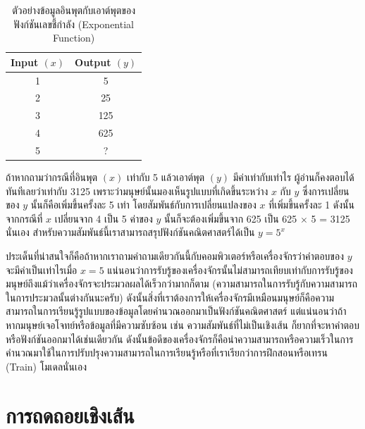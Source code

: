 \begin{table}[H]
    \centering
    \caption{ตัวอย่างข้อมูลอินพุตกับเอาต์พุตของฟังก์ชันเลขชี้กำลัง (Exponential Function)}
    \label{tab:simple_x_y}
    \begin{tabular}{cc}
        \toprule
        \textbf{Input $(x)$} & \textbf{Output $(y)$} \\
        \midrule
        1                    & 5                     \\
        2                    & 25                    \\
        3                    & 125                   \\
        4                    & 625                   \\
        5                    & ?                     \\
        \bottomrule
    \end{tabular}
\end{table}

ถ้าหากถามว่ากรณีที่อินพุต $(x)$ เท่ากับ 5 แล้วเอาต์พุต $(y)$ มีค่าเท่ากับเท่าไร ผู้อ่านก็คงตอบได้ทันทีเลยว่าเท่ากับ 3125 เพราะว่ามนุษย์นั้นมองเห็นรูปแบบที่เกิดขึ้นระหว่าง $x$ กับ $y$ ซึ่งการเปลี่ยนของ $y$ นั้นก็คือเพิ่มขึ้นครั้งละ 5 เท่า โดยสัมพันธ์กับการเปลี่ยนแปลงของ $x$ ที่เพิ่มขึ้นครั้งละ 1 ดังนั้นจากกรณีที่ $x$ เปลี่ยนจาก 4 เป็น 5 ค่าของ $y$ นั้นก็จะต้องเพิ่มขึ้นจาก 625 เป็น 625 $\times$ 5 = 3125 นั่นเอง สำหรับความสัมพันธ์นี้เราสามารถสรุปฟังก์ชันคณิตศาสตร์ได้เป็น $y = 5^{x}$

ประเด็นที่น่าสนใจก็คือถ้าหากเราถามคำถามเดียวกันนี้กับคอมพิวเตอร์หรือเครื่องจักรว่าคำตอบของ $y$ จะมีค่าเป็นเท่าไรเมื่อ $x = 5$ แน่นอนว่าการรับรู้ของเครื่องจักรนั้นไม่สามารถเทียบเท่ากับการรับรู้ของมนุษย์ถึงแม้ว่าเครื่องจักรจะประมวลผลได้เร็วกว่ามากก็ตาม (ความสามารถในการรับรู้กับความสามารถในการประมวลนั้นต่างกันนะครับ) ดังนั้นสิ่งที่เราต้องการให้เครื่องจักรมีเหมือนมนุษย์ก็คือความสามารถในการเรียนรู้รูปแบบของข้อมูลโดยคำนวณออกมาเป็นฟังก์ชันคณิตศาสตร์ แต่แน่นอนว่าถ้าหากมนุษย์เจอโจทย์หรือข้อมูลที่มีความซับซ้อน เช่น ความสัมพันธ์ที่ไม่เป็นเชิงเส้น ก็ยากที่จะหาคำตอบหรือฟังก์ชันออกมาได้เช่นเดียวกัน ดังนั้นข้อดีของเครื่องจักรก็คือนำความสามารถหรือความเร็วในการคำนวณมาใช้ในการปรับปรุงความสามารถในการเรียนรู้หรือที่เราเรียกว่าการฝึกสอนหรือเทรน (Train) โมเดลนั่นเอง

\section{การถดถอยเชิงเส้น}
\label{sec:lin_res}

